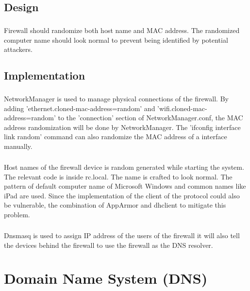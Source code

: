 \documentclass[mscthesis]{usiinfthesis}
\begin{document}
\section{Design}
\paragraph{}
Firewall should randomize both host name and MAC address. The randomized computer name should look normal to prevent being identified by potential attackers.


\section{Implementation}
\paragraph{}
NetworkManager is used to manage physical connections of the firewall. By adding 'ethernet.cloned-mac-address=random' and 'wifi.cloned-mac-address=random' to the 'connection' section of NetworkManager.conf, the MAC address randomization will be done by NetworkManager. The 'ifconfig interface link random' command can also randomize the MAC address of a interface manually.
\paragraph{}
Host names of the firewall device is random generated while starting the system. The relevant code is inside rc.local. The name is crafted to look normal. The pattern of default computer name of Microsoft Windows and common names like iPad are used. Since the implementation of the client of the protocol could also be vulnerable, the combination of AppArmor and dhclient to mitigate this problem.
\paragraph{}
Dnsmasq is used to assign IP address of the users of the firewall it will also tell the devices behind the firewall to use the firewall as the DNS resolver.

\chapter{Domain Name System (DNS)}
\end{document}
